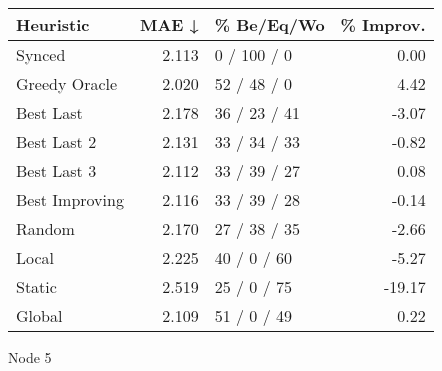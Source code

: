 \begin{tabular}{lrlr}
\toprule
\textbf{Heuristic} & \textbf{MAE ↓} & \textbf{\% Be/Eq/Wo} & \textbf{\% Improv.} \\
\midrule
            Synced &          2.113 &          0 / 100 / 0 &                0.00 \\
     Greedy Oracle &          2.020 &          52 / 48 / 0 &                4.42 \\
         Best Last &          2.178 &         36 / 23 / 41 &               -3.07 \\
       Best Last 2 &          2.131 &         33 / 34 / 33 &               -0.82 \\
       Best Last 3 &          2.112 &         33 / 39 / 27 &                0.08 \\
    Best Improving &          2.116 &         33 / 39 / 28 &               -0.14 \\
            Random &          2.170 &         27 / 38 / 35 &               -2.66 \\
             Local &          2.225 &          40 / 0 / 60 &               -5.27 \\
            Static &          2.519 &          25 / 0 / 75 &              -19.17 \\
            Global &          2.109 &          51 / 0 / 49 &                0.22 \\
\bottomrule
\end{tabular}
\caption{Node 5}
\label{tab:hr_non_lr05_le2_bs2_5}
